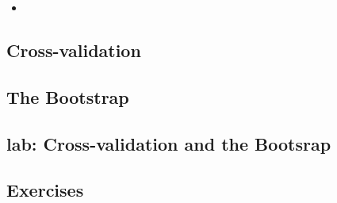 \begin{itemize}
	\item
 \end{itemize}
\subsection{Cross-validation}

\subsection{The Bootstrap}

\subsection{lab: Cross-validation and the Bootsrap}

\subsection{Exercises}

